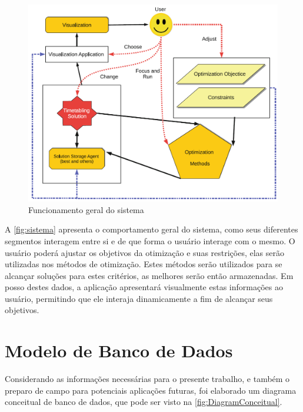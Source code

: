 \begin{figure}[htbp]\centering
  \caption{Funcionamento geral do sistema}
  \label{fig:sistema}
  \includegraphics[width=\textwidth]{files/img/Arquitetura/Arquitetura_bebis_information_2019}
\end{figure}

A \autoref{fig:sistema} apresenta o comportamento geral do sistema, como seus diferentes segmentos interagem entre si e de que forma o usuário interage com o mesmo. O usuário poderá ajustar os objetivos da otimização e suas restrições, elas serão utilizadas nos métodos de otimização. Estes métodos serão utilizados para se alcançar soluções para estes critérios, as melhores serão então armazenadas. Em posso destes dados, a aplicação apresentará visualmente estas informações ao usuário, permitindo que ele interaja dinamicamente a fim de alcançar seus objetivos.

\section{Modelo de Banco de Dados} \label{sec:ModelagemBD} %

Considerando as informações necessárias para o presente trabalho, e também o preparo de campo para potenciais aplicações futuras, foi elaborado um diagrama conceitual de banco de dados, que pode ser visto na \autoref{fig:DiagramConceitual}.


